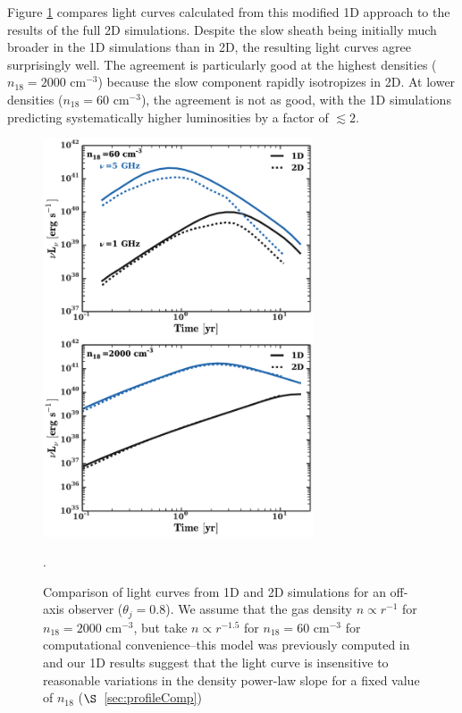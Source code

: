 \documentclass[usenatbib,fleqn]{mnras}
\begin{document}
Figure \ref{fig:1D2DB} compares light curves calculated from this
modified 1D approach to the results of the full 2D simulations.
Despite the slow sheath being initially much broader in the 1D
simulations than in 2D, the resulting light curves agree surprisingly
well.  The agreement is particularly good at the highest densities
($n_{18}=2000$ cm$^{-3}$) because the slow component rapidly
isotropizes in 2D.  At lower densities ($n_{18}=60$ cm$^{-3}$), the
agreement is not as good, with the 1D simulations predicting
systematically higher luminosities by a factor of $\lesssim 2$.



\begin{figure}
\includegraphics[width=8cm]{1d_2d.pdf}
\caption{\label{fig:1D2DB} Comparison of light curves from 1D and 2D
  simulations for an off-axis observer ($\theta_{j} = 0.8$). We
  assume that the gas density $n\propto r^{-1}$ for $n_{18}=2000$
  cm$^{-3}$, but take $n\propto r^{-1.5}$ for $n_{18}=60$ cm$^{-3}$
  for computational convenience--this model was previously computed in
  \citet{Mimica+2015} and our 1D results suggest that the light curve
  is insensitive to reasonable variations in the density power-law
  slope for a fixed value of $n_{18}$ ($\S$~\ref{sec:profileComp})}.
\end{figure}
\end{document}
